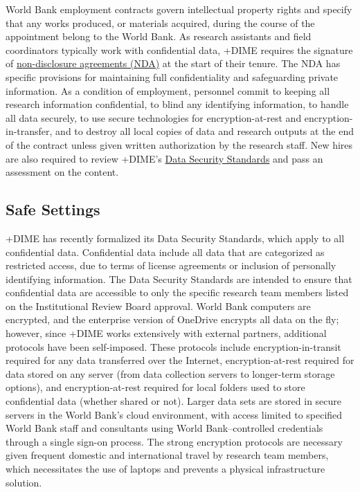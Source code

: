 \documentclass[
]{book}
\begin{document}
World Bank employment contracts govern intellectual property rights and specify that any works produced, or materials acquired, during the course of the appointment belong to the World Bank. As research assistants and field coordinators typically work with confidential data, +DIME\textbar{} requires the signature of \href{https://github.com/worldbank/dime-standards/blob/master/dime-research-standards/pillar-4-data-security/data-security-resources/dime-data-nda-mou.md}{non-disclosure agreements (NDA)} at the start of their tenure. The NDA has specific provisions for maintaining full confidentiality and safeguarding private information. As a condition of employment, personnel commit to keeping all research information confidential, to blind any identifying information, to handle all data securely, to use secure technologies for encryption-at-rest and encryption-in-transfer, and to destroy all local copies of data and research outputs at the end of the contract unless given written authorization by the research staff. New hires are also required to review +DIME\textbar's \href{https://github.com/worldbank/dime-standards/tree/master/dime-research-standards/pillar-4-data-security}{Data Security Standards} and pass an assessment on the content.

\hypertarget{safe-settings-7}{%
\subsection{Safe Settings}\label{safe-settings-7}}

+DIME\textbar{} has recently formalized its Data Security Standards, which apply to all confidential data. Confidential data include all data that are categorized as restricted access, due to terms of license agreements or inclusion of personally identifying information. The Data Security Standards are intended to ensure that confidential data are accessible to only the specific research team members listed on the Institutional Review Board approval. World Bank computers are encrypted, and the enterprise version of OneDrive encrypts all data on the fly; however, since +DIME\textbar{} works extensively with external partners, additional protocols have been self-imposed. These protocols include encryption-in-transit required for any data transferred over the Internet, encryption-at-rest required for data stored on any server (from data collection servers to longer-term storage options), and encryption-at-rest required for local folders used to store confidential data (whether shared or not). Larger data sets are stored in secure servers in the World Bank's cloud environment, with access limited to specified World Bank staff and consultants using World Bank--controlled credentials through a single sign-on process. The strong encryption protocols are necessary given frequent domestic and international travel by research team members, which necessitates the use of laptops and prevents a physical infrastructure solution.
\end{document}
